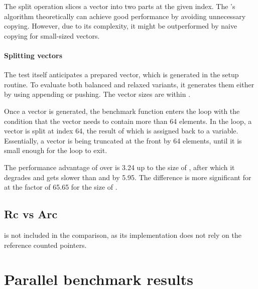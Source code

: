 The split operation slices a vector into two parts at the given index. The \rrbtree{}'s algorithm theoretically can achieve good performance by avoiding unnecessary copying. However, due to its complexity, it might be outperformed by naive copying for small-sized vectors.

\paragraph{Splitting vectors}
The test itself anticipates a prepared vector, which is generated in the setup routine. To evaluate both balanced and relaxed variants, it generates them either by using appending or pushing. The vector sizes are within \range{[128, \kilo{200}]}.

Once a vector is generated, the benchmark function enters the loop with the condition that the vector needs to contain more than 64 elements. In the loop, a vector is split at index 64, the result of which is assigned back to a variable. Essentially, a vector is being truncated at the front by 64 elements, until it is small enough for the loop to exit.



The performance advantage of \stdvec{} over \rrbvec{} is 3.24 up to the size of , after which it degrades and gets slower than \imrsvec{} and \rrbvec{} by 5.95. The difference is more significant for \rbvec{} at the factor of 65.65 for the size of .

\subsection{Rc vs Arc}
\label{sec:perf-rc-vs-arc}
\stdvec{} is not included in the comparison, as its implementation does not rely on the reference counted pointers.

\section{Parallel benchmark results}
\label{sec:par-benchmarks}

